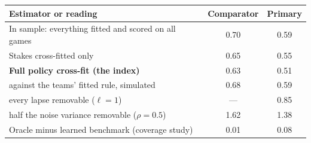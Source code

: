 \begin{tabular}{p{7.4cm}cc}
\toprule
Estimator or reading & Comparator & Primary \\
\midrule
In sample: everything fitted and scored on all games & 0.70 & 0.59 \\
Stakes cross-fitted only & 0.65 & 0.55 \\
\textbf{Full policy cross-fit (the index)} & 0.63 & 0.51 \\
\quad against the teams' fitted rule, simulated & 0.68 & 0.59 \\
\quad every lapse removable ($\ell=1$) & --- & 0.85 \\
\quad half the noise variance removable ($\rho=0.5$) & 1.62 & 1.38 \\
Oracle minus learned benchmark (coverage study) & 0.01 & 0.08 \\
\bottomrule
\end{tabular}
